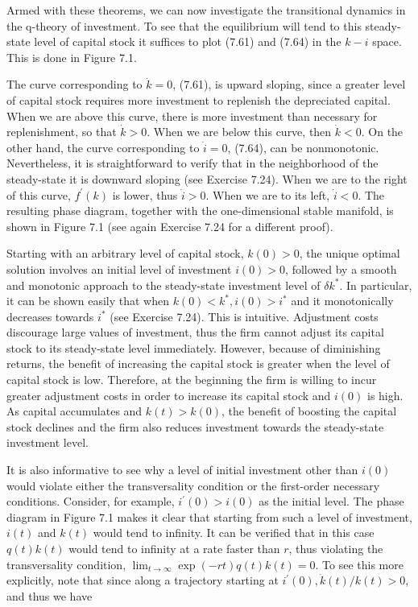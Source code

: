 \documentclass[\topdir/lecture_notes.tex]{subfiles}
\begin{document}
Armed with these theorems, we can now investigate the transitional dynamics in the q-theory of investment. To see that the equilibrium will tend to this steady-state level of capital stock it suffices to plot (7.61) and (7.64) in the $k-i$ space. This is done in Figure 7.1.

The curve corresponding to $\dot{k}=0$, (7.61), is upward sloping, since a greater level of capital stock requires more investment to replenish the depreciated capital. When we are above this curve, there is more investment than necessary for replenishment, so that $\dot{k}>0$. When we are below this curve, then $\dot{k}<0$. On the other hand, the curve corresponding to $\dot{i}=0$, (7.64), can be nonmonotonic. Nevertheless, it is straightforward to verify that in the neighborhood of the steady-state it is downward sloping (see Exercise 7.24). When we are to the right of this curve, $f^{\prime}(k)$ is lower, thus $\dot{i}>0$. When we are to its left, $\dot{i}<0$. The resulting phase diagram, together with the one-dimensional stable manifold, is shown in Figure 7.1 (see again Exercise 7.24 for a different proof).

Starting with an arbitrary level of capital stock, $k(0)>0$, the unique optimal solution involves an initial level of investment $i(0)>0$, followed by a smooth and monotonic approach to the steady-state investment level of $\delta k^{*}$. In particular, it can be shown easily that when $k(0)<k^{*}, i(0)>i^{*}$ and it monotonically decreases towards $i^{*}$ (see Exercise 7.24). This is intuitive. Adjustment costs discourage large values of investment, thus the firm cannot adjust its capital stock to its steady-state level immediately. However, because of diminishing returns, the benefit of increasing the capital stock is greater when the level of capital stock is low. Therefore, at the beginning the firm is willing to incur greater adjustment costs in order to increase its capital stock and $i(0)$ is high. As capital accumulates and $k(t)>k(0)$, the benefit of boosting the capital stock declines and the firm also reduces investment towards the steady-state investment level.

It is also informative to see why a level of initial investment other than $i(0)$ would violate either the transversality condition or the first-order necessary conditions. Consider, for example, $i^{\prime}(0)>i(0)$ as the initial level. The phase diagram in Figure 7.1 makes it clear that starting from such a level of investment, $i(t)$ and $k(t)$ would tend to infinity. It can be verified that in this case $q(t) k(t)$ would tend to infinity at a rate faster than $r$, thus violating the transversality condition, $\lim _{t \rightarrow \infty} \exp (-r t) q(t) k(t)=0$. To see this more explicitly, note that since along a trajectory starting at $i^{\prime}(0), \dot{k}(t) / k(t)>0$, and thus we have
\end{document}
